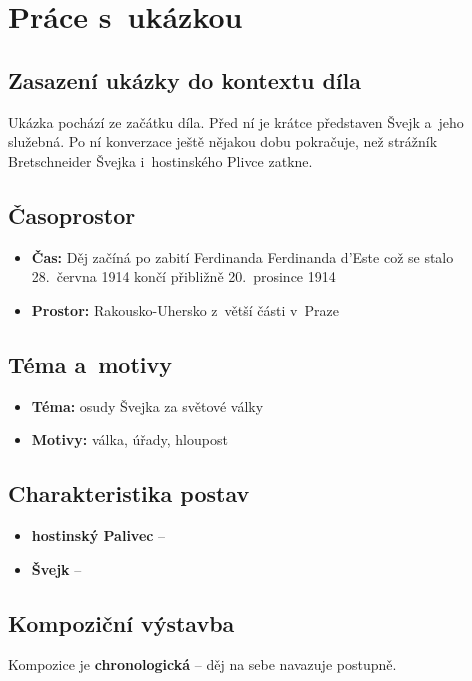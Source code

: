 \section{Práce s~ukázkou}

\subsection{Zasazení ukázky do kontextu díla}
Ukázka pochází ze začátku díla. Před ní je krátce představen Švejk a~jeho služebná. Po ní konverzace ještě nějakou dobu pokračuje, než strážník Bretschneider Švejka i~hostinského Plivce zatkne.

\subsection{Časoprostor}
\begin{itemize}
    \item \textbf{Čas:} Děj začíná po zabití Ferdinanda Ferdinanda d'Este což se stalo 28.~června 1914\cite{wiki:Frantisek_Ferdinand} končí přibližně 20.~prosince 1914\cite[174]{osudy_dobreho_vojaka_svejka}
	\item \textbf{Prostor:} Rakousko-Uhersko z~větší části v~Praze
\end{itemize}

\subsection{Téma a~motivy}
\begin{itemize}
    \item \textbf{Téma:} osudy Švejka za světové války
    \item \textbf{Motivy:} válka, úřady, hloupost
\end{itemize}

\subsection{Charakteristika postav}
\begin{itemize}
	\item \textbf{hostinský Palivec} --
	\item \textbf{Švejk} --
\end{itemize}

\subsection{Kompoziční výstavba}
Kompozice je \textbf{chronologická} -- děj na sebe navazuje postupně.


